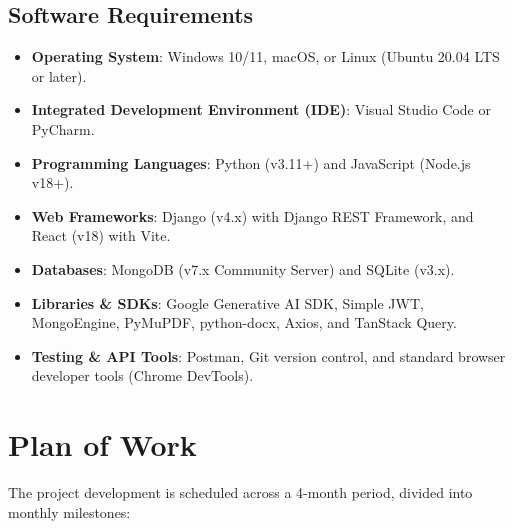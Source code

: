 \documentclass[12pt,a4paper]{article}
\begin{document}
\subsection{Software Requirements}
\begin{itemize}
    \item \textbf{Operating System}: Windows 10/11, macOS, or Linux (Ubuntu 20.04 LTS or later).
    \item \textbf{Integrated Development Environment (IDE)}: Visual Studio Code or PyCharm.
    \item \textbf{Programming Languages}: Python (v3.11+) and JavaScript (Node.js v18+).
    \item \textbf{Web Frameworks}: Django (v4.x) with Django REST Framework, and React (v18) with Vite.
    \item \textbf{Databases}: MongoDB (v7.x Community Server) and SQLite (v3.x).
    \item \textbf{Libraries \& SDKs}: Google Generative AI SDK, Simple JWT, MongoEngine, PyMuPDF, python-docx, Axios, and TanStack Query.
    \item \textbf{Testing \& API Tools}: Postman, Git version control, and standard browser developer tools (Chrome DevTools).
\end{itemize}

\clearpage

\section{Plan of Work}

The project development is scheduled across a 4-month period, divided into monthly milestones:
\end{document}
